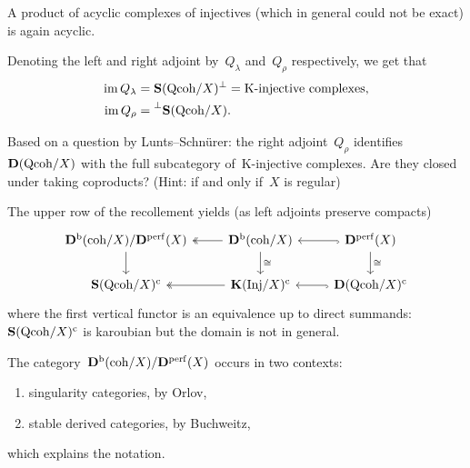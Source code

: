 \documentclass[10pt,a4paper]{article}
\begin{document}
\begin{corollary}
  A product of acyclic complexes of injectives (which in general could not be exact) is again acyclic.
\end{corollary}

\begin{remark}
  Denoting the left and right adjoint by~$Q_\lambda$ and~$Q_\rho$ respectively, we get that
  \begin{equation}
    \begin{aligned}
      \operatorname{im} Q_\lambda&=\operatorname{\mathbf{S}}(\mathrm{Qcoh}/X)^\perp=\text{K-injective complexes}, \\
      \operatorname{im} Q_\rho&=\prescript{\perp}{}{\operatorname{\mathbf{S}}(\ensuremath{\mathrm{Qcoh}}/X)}.
    \end{aligned}
  \end{equation}
\end{remark}

\begin{exercise}
  Based on a question by Lunts--Schn\"urer: the right adjoint~$Q_\rho$ identifies~$\mathbf{D}(\mathrm{Qcoh}/X)$ with the full subcategory of~K-injective complexes. Are they closed under taking coproducts? (Hint: if and only if~$X$ is regular)
\end{exercise}

\begin{corollary}
  The upper row of the recollement yields (as left adjoints preserve compacts)
  \begin{equation}
    \begin{tikzcd}
      \derived^\bounded(\coh/X)/\derived^\perf(X) \arrow{d} & \derived^\bounded(\coh/X) \arrow{d}{\cong} \arrow[two heads]{l} & \derived^\perf(X) \arrow{d}{\cong} \arrow[hook]{l} \\
      \SSing(\Qcoh/X)^\cc & \KKK(\Inj/X)^\cc \arrow[two heads]{l} & \derived(\Qcoh/X)^\cc \arrow[hook]{l}
    \end{tikzcd}
  \end{equation}
  where the first vertical functor is an equivalence up to direct summands: $\operatorname{\mathbf{S}}(\mathrm{Qcoh}/X)^{\mathrm{c}}$ is karoubian but the domain is not in general.
\end{corollary}
The category~$\mathbf{D}^{\mathrm{b}}(\mathrm{coh}/X)/\mathbf{D}^{\mathrm{perf}}(X)$ occurs in two contexts:
\begin{enumerate}
  \item singularity categories, by Orlov,
  \item stable derived categories, by Buchweitz,
\end{enumerate}
which explains the notation.
\end{document}

